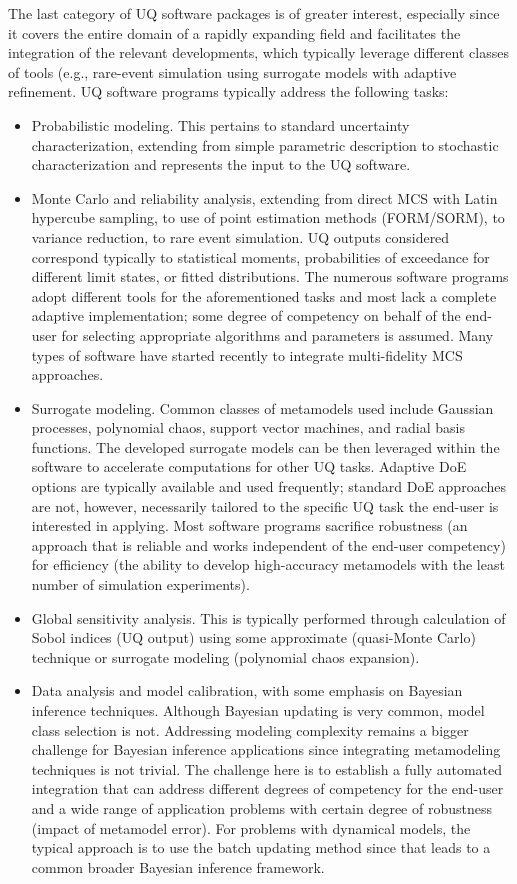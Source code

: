 The last category of UQ software packages is of greater interest, especially since it covers the entire domain of a rapidly expanding field and facilitates the integration of the relevant developments, which typically leverage different classes of tools (e.g., rare-event simulation using surrogate models with adaptive refinement. UQ software programs typically address the following tasks:

\begin{itemize}
    \item Probabilistic modeling. This pertains to standard uncertainty characterization, extending from simple parametric description to stochastic characterization and represents the input to the UQ software.
    \item Monte Carlo and reliability analysis, extending from direct MCS with Latin hypercube sampling, to use of point estimation methods (FORM/SORM), to variance reduction, to rare event simulation. UQ outputs considered correspond typically to statistical moments, probabilities of exceedance for different limit states, or fitted distributions. The numerous software programs adopt different tools for the aforementioned tasks and most lack a complete adaptive implementation; some degree of competency on behalf of the end-user for selecting appropriate algorithms and parameters is assumed. Many types of software have started recently to integrate multi-fidelity MCS approaches.
    \item Surrogate modeling. Common classes of metamodels used include Gaussian processes, polynomial chaos, support vector machines, and radial basis functions. The developed surrogate models can be then leveraged within the software to accelerate computations for other UQ tasks. Adaptive DoE options are typically available and used frequently; standard DoE approaches are not, however, necessarily tailored to the specific UQ task the end-user is interested in applying. Most software programs sacrifice robustness (an approach that is reliable and works independent of the end-user competency) for efficiency (the ability to develop high-accuracy metamodels with the least number of simulation experiments).
    \item Global sensitivity analysis. This is typically performed through calculation of Sobol indices (UQ output) using some approximate (quasi-Monte Carlo) technique or surrogate modeling (polynomial chaos expansion). 
    \item Data analysis and model calibration, with some emphasis on Bayesian inference techniques. Although Bayesian updating is very common, model class selection is not. Addressing modeling complexity remains a bigger challenge for Bayesian inference applications since integrating metamodeling techniques is not trivial. The challenge here is to establish a fully automated integration that can address different degrees of competency for the end-user and a wide range of application problems with certain degree of robustness (impact of metamodel error). For problems with dynamical models, the typical approach is to use the batch updating method since that leads to a common broader Bayesian inference framework. 

\end{itemize}
